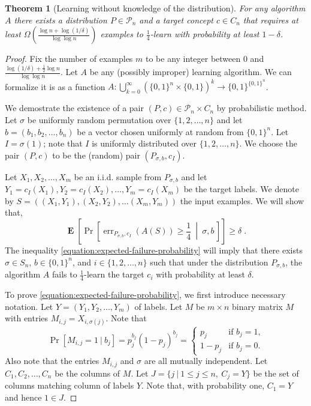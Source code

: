 \documentclass[10pt]{article}
\newtheorem{theorem}[proposition]{Theorem}
\renewcommand{\P}{\mathcal{P}}
\DeclareMathOperator{\err}{err}
\DeclareMathOperator{\Exp}{\mathbf{E}}
\begin{document}
\begin{theorem}[Learning without knowledge of the distribution]
For any algorithm $A$ there exists a distribution $P \in \P_n$
and a target concept $c \in C_n$ that requires at least $\Omega \left(\frac{\log n + \log(1/\delta)}{\log \log n} \right)$
examples to $\frac{1}{4}$-learn with probability at least $1 - \delta$.
\end{theorem}

\begin{proof}
Fix the number of examples $m$ to be any integer between $0$ and
$\frac{\log(1/\delta) + \frac{1}{2} \log n}{\log \log n}$. Let $A$ be any
(possibly improper) learning algorithm. We can formalize it is as a function
$A:\bigcup_{k=0}^\infty (\{0,1\}^n \times \{0,1\})^k \to \{0,1\}^{\{0,1\}^n}$.

We demostrate the existence of a pair $(P,c) \in \P_n \times C_n$ by
probabilistic method. Let $\sigma$ be uniformly random permutation over
$\{1,2,\dots,n\}$ and let $b = (b_1, b_2, \dots, b_n)$ be a vector chosen
uniformly at random from $\{0,1\}^n$. Let $I = \sigma(1)$; note that $I$ is
uniformly distributed over $\{1,2,\dots,n\}$. We choose the pair $(P,c)$ to be
the (random) pair $(P_{\sigma,b},c_I)$.

Let $X_1, X_2, \dots, X_m$ be an i.i.d. sample from $P_{\sigma,b}$ and
let $Y_1 = c_I(X_1), Y_2 = c_I(X_2), \dots, Y_m = c_I(X_m)$ be the target labels.
We denote by $S = ((X_1, Y_1), (X_2, Y_2), \dots (X_m, Y_m))$ the input examples.
We will show that,
\begin{equation}
\label{equation:expected-failure-probability}
\Exp \left[ \Pr \left[\err_{P_{\sigma,b},c_I}(A(S)) \ge \frac{1}{4} \ \middle| \ \sigma, b \, \right] \right] \ge \delta \; .
\end{equation}
The inequality \eqref{equation:expected-failure-probability} will imply that
there exists $\sigma \in S_n$, $b \in \{0,1\}^n$, and $i \in
\{1,2,\dots,n\}$ such that under the distribution $P_{\sigma,b}$, the
algorithm $A$ fails to $\frac{1}{4}$-learn the target $c_i$ with probability at least $\delta$.

To prove \eqref{equation:expected-failure-probability}, we first introduce
necessary notation. Let $Y = (Y_1, Y_2, \dots, Y_m)$ of labels.
Let $M$ be $m \times n$ binary matrix $M$ with entries
$M_{i,j} = X_{i,\sigma(j)}$. Note that
$$
\Pr[M_{i,j} = 1 ~|~ b_j] =
p_j^{b_j} (1 - p_j)^{b_j} =
\begin{cases}
p_j & \text{if $b_j = 1$,} \\
1 - p_j & \text{if $b_j = 0$.}
\end{cases}
$$
Also note that the entries $M_{i,j}$ and $\sigma$ are all mutually independent.
Let $C_1, C_2, \dots, C_n$ be the columns of $M$. Let $J = \{ j ~|~ 1 \le j \le
n, \ C_j = Y \}$ be the set of columns matching column of labels $Y$. Note that,
with probability one, $C_1 = Y$ and hence $1 \in J$.


\end{proof}
\end{document}
